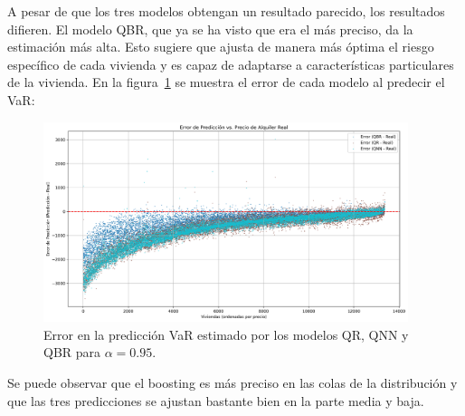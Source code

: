 \documentclass[11pt]{book}
\theoremstyle{plain} %
\theoremstyle{definition} %
\begin{document}
A pesar de que los tres modelos obtengan un resultado parecido, 
los resultados difieren. El modelo QBR, que 
ya se ha visto que era el más preciso, da la estimación más alta. Esto sugiere 
que ajusta de manera más óptima el riesgo específico de cada vivienda y 
es capaz de adaptarse a características particulares de la vivienda. En 
la figura~\ref{fig:var_error} se muestra el error de cada modelo al
predecir el VaR:
 \newpage

\begin{figure}[H]
   \centering
   \includegraphics[width=0.95\textwidth]{errores_var.png}
   \caption{Error en la predicción VaR estimado por los modelos QR, QNN y QBR para $\alpha=0.95$.}
   \label{fig:var_error}
\end{figure}

Se puede observar que el boosting es más preciso en las colas de la distribución y que 
las tres predicciones se ajustan bastante bien  en la parte media y baja.\\
\end{document}

